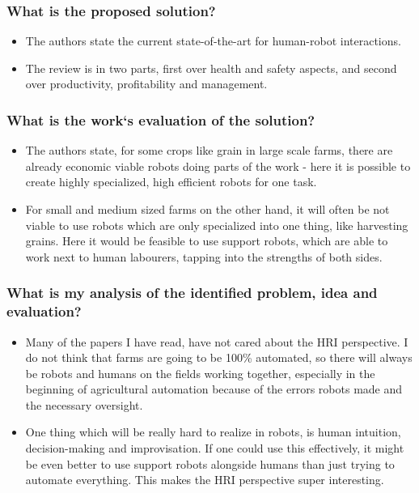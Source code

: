     \subsubsection*{What is the proposed solution?}
    \begin{itemize}
        \item The authors state the current state-of-the-art for human-robot interactions.
        \item The review is in two parts, first over health and safety aspects, and second over productivity, profitability and management.
    \end{itemize}
    \subsubsection*{What is the work`s evaluation of the solution?}
    \begin{itemize}
        \item The authors state, for some crops like grain in large scale farms, there are already economic viable robots doing parts of the work - here it is possible to create highly specialized, high efficient robots for one task.
        \item For small and medium sized farms on the other hand, it will often be not viable to use robots which are only specialized into one thing, like harvesting grains. Here it would be feasible to use support robots, which are able to work next to human labourers, tapping into the strengths of both sides.
    \end{itemize}
    \subsubsection*{What is my analysis of the identified problem, idea and evaluation?}
    \begin{itemize}
        \item Many of the papers I have read, have not cared about the HRI perspective. I do not think that farms are going to be 100\% automated, so there will always be robots and humans on the fields working together, especially in the beginning of agricultural automation because of the errors robots made and the necessary oversight.
        \item One thing which will be really hard to realize in robots, is human intuition, decision-making and improvisation. If one could use this effectively, it might be even better to use support robots alongside humans than just trying to automate everything. This makes the HRI perspective super interesting.
    \end{itemize}
